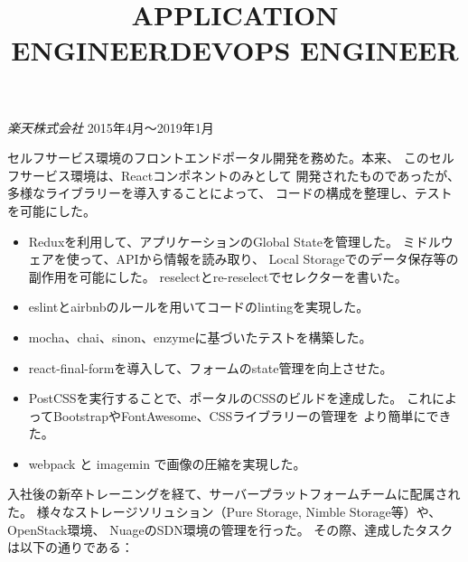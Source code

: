 \documentclass{res}
\begin{document}
\begin{resume}
\vspace{8pt}
{\sl 楽天株式会社} \hfill        2015年4月～2019年1月
\vspace{8pt}

\title{APPLICATION ENGINEER}
\employer{}
\location{}
\begin{position}
セルフサービス環境のフロントエンドポータル開発を務めた。本来、
このセルフサービス環境は、Reactコンポネントのみとして
開発されたものであったが、多様なライブラリーを導入することによって、
コードの構成を整理し、テストを可能にした。\\

 \begin{itemize} \itemsep -2pt %
  \item Reduxを利用して、アプリケーションのGlobal Stateを管理した。
        ミドルウェアを使って、APIから情報を読み取り、
        Local Storageでのデータ保存等の副作用を可能にした。
        reselectとre-reselectでセレクターを書いた。
  \item eslintとairbnbのルールを用いてコードのlintingを実現した。
  \item mocha、chai、sinon、enzymeに基づいたテストを構築した。
  \item react-final-formを導入して、フォームのstate管理を向上させた。
  \item PostCSSを実行することで、ポータルのCSSのビルドを達成した。
        これによってBootstrapやFontAwesome、CSSライブラリーの管理を
        より簡単にできた。
  \item webpack と imagemin で画像の圧縮を実現した。
 \end{itemize}
\end{position}

\title{DEVOPS ENGINEER}
\employer{}
\location{}
\begin{position}
入社後の新卒トレーニングを経て、サーバープラットフォームチームに配属された。
様々なストレージソリュション（Pure Storage, Nimble Storage等）や、OpenStack環境、
NuageのSDN環境の管理を行った。
その際、達成したタスクは以下の通りである：\\


\end{position}
\end{resume}
\end{document}
